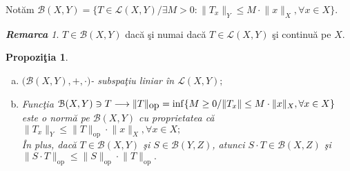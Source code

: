 \documentclass[ a4paper, 12pt]{report}
\newtheorem{prop}[theorem]{\bf Propozi\c tia }
\theoremstyle{remark}
\newtheorem{remarc}{\bf Remarca}[section]
\numberwithin{equation}{section}
\begin{document}
Not\u am $\mathcal{B}(X,Y) = \{ T \in \mathcal{L}(X,Y) / \exists M>0: \lVert T_x \rVert_{Y} \leq M \cdot \lVert x \rVert_{X}, \forall x \in X \}.$
\begin{remarc}
$T \in \mathcal{B}(X,Y) $ dac\u a \c si numai dac\u a $T \in \mathcal{L}(X,Y)$ \c si continu\u a pe $X$.
\end{remarc}
\begin{prop}
\begin{enumerate}[(a)]
\item $\Big(\mathcal{B}(X,Y), +, \cdot\Big)$- subspa\c tiu liniar \^in $\mathcal{L}(X,Y);$
\item Func\c tia $\mathcal{B}(X,Y) \ni T \longrightarrow \lVert T \rVert_{\mbox{op}} = \inf \{ M \geq 0 / \lVert T_x \rVert \leq M \cdot \lVert x \rVert_{X},\\ \forall x \in X\}$ este o norm\u a pe $\mathcal{B}(X,Y)$ cu proprietatea c\u a\\ $\lVert T_x \rVert_{Y} \leq \lVert T \rVert_{\mbox{op}} \cdot \lVert x \rVert_{X}, \forall x \in X;$\\
\^In plus, dac\u a $T \in \mathcal{B}(X,Y)$ \c si $S \in \mathcal{B}(Y,Z)$, atunci $S \cdot T \in \mathcal{B}(X,Z)$ \c si $\lVert S \cdot T \rVert_{\mbox{op}} \leq \lVert S \rVert_{\mbox{op}} \cdot \lVert T \rVert_{\mbox{op}}.$
\end{enumerate}







\end{prop}
\end{document}
